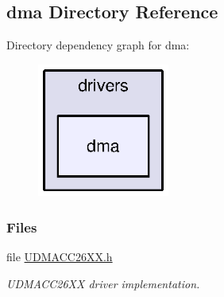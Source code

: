 \subsection{dma Directory Reference}
\label{dir_86d53b1fe72f4e39c818d6d79a0d8b7f}
Directory dependency graph for dma\-:
\nopagebreak
\begin{figure}[H]
\begin{center}
\leavevmode
\includegraphics[width=123pt]{dir_86d53b1fe72f4e39c818d6d79a0d8b7f_dep}
\end{center}
\end{figure}
\subsubsection*{Files}
\begin{DoxyCompactItemize}
\item 
file \hyperlink{_u_d_m_a_c_c26_x_x_8h}{U\-D\-M\-A\-C\-C26\-X\-X.\-h}
\begin{DoxyCompactList}\small\item\em U\-D\-M\-A\-C\-C26\-X\-X driver implementation. \end{DoxyCompactList}\end{DoxyCompactItemize}
